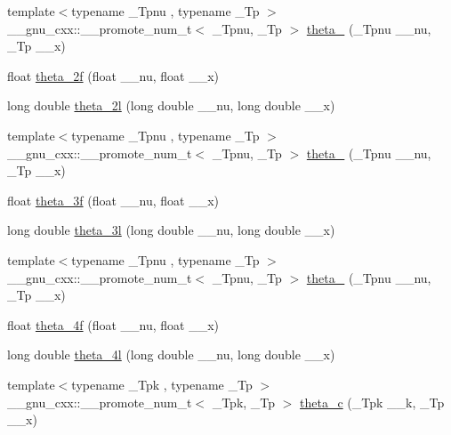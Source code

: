 \begin{DoxyCompactItemize}
\item 
{\footnotesize template$<$typename \+\_\+\+Tpnu , typename \+\_\+\+Tp $>$ }\\\+\_\+\+\_\+gnu\+\_\+cxx\+::\+\_\+\+\_\+promote\+\_\+num\+\_\+t$<$ \+\_\+\+Tpnu, \+\_\+\+Tp $>$ \hyperlink{namespace____gnu__cxx_a762aa79fc6c6320d7c6290359a42c2bc}{theta\+\_} (\+\_\+\+Tpnu \+\_\+\+\_\+nu, \+\_\+\+Tp \+\_\+\+\_\+x)
\item 
float \hyperlink{namespace____gnu__cxx_a78e832796aedf5159b142801e1184392}{theta\+\_\+2f} (float \+\_\+\+\_\+nu, float \+\_\+\+\_\+x)
\item 
long double \hyperlink{namespace____gnu__cxx_ac5a30c772d4888442665945e7f3fa017}{theta\+\_\+2l} (long double \+\_\+\+\_\+nu, long double \+\_\+\+\_\+x)
\item 
{\footnotesize template$<$typename \+\_\+\+Tpnu , typename \+\_\+\+Tp $>$ }\\\+\_\+\+\_\+gnu\+\_\+cxx\+::\+\_\+\+\_\+promote\+\_\+num\+\_\+t$<$ \+\_\+\+Tpnu, \+\_\+\+Tp $>$ \hyperlink{namespace____gnu__cxx_a1383b7486de1e177f19c45411ed957c3}{theta\+\_} (\+\_\+\+Tpnu \+\_\+\+\_\+nu, \+\_\+\+Tp \+\_\+\+\_\+x)
\item 
float \hyperlink{namespace____gnu__cxx_a9a7c967d2a456f1a6aceee9a53f024b1}{theta\+\_\+3f} (float \+\_\+\+\_\+nu, float \+\_\+\+\_\+x)
\item 
long double \hyperlink{namespace____gnu__cxx_af88874ff6c69940d2191f7947d2ea119}{theta\+\_\+3l} (long double \+\_\+\+\_\+nu, long double \+\_\+\+\_\+x)
\item 
{\footnotesize template$<$typename \+\_\+\+Tpnu , typename \+\_\+\+Tp $>$ }\\\+\_\+\+\_\+gnu\+\_\+cxx\+::\+\_\+\+\_\+promote\+\_\+num\+\_\+t$<$ \+\_\+\+Tpnu, \+\_\+\+Tp $>$ \hyperlink{namespace____gnu__cxx_a7b4afc32eb3f1d7c49662cd37af56a20}{theta\+\_} (\+\_\+\+Tpnu \+\_\+\+\_\+nu, \+\_\+\+Tp \+\_\+\+\_\+x)
\item 
float \hyperlink{namespace____gnu__cxx_a0c5cbf87e304844ed4c3423be5ca09a5}{theta\+\_\+4f} (float \+\_\+\+\_\+nu, float \+\_\+\+\_\+x)
\item 
long double \hyperlink{namespace____gnu__cxx_aaf63a80e90cdcdd66ebb18cd3a84afae}{theta\+\_\+4l} (long double \+\_\+\+\_\+nu, long double \+\_\+\+\_\+x)
\item 
{\footnotesize template$<$typename \+\_\+\+Tpk , typename \+\_\+\+Tp $>$ }\\\+\_\+\+\_\+gnu\+\_\+cxx\+::\+\_\+\+\_\+promote\+\_\+num\+\_\+t$<$ \+\_\+\+Tpk, \+\_\+\+Tp $>$ \hyperlink{namespace____gnu__cxx_ad2326374205feca04a9996af0a4ebd2a}{theta\+\_\+c} (\+\_\+\+Tpk \+\_\+\+\_\+k, \+\_\+\+Tp \+\_\+\+\_\+x)

\end{DoxyCompactItemize}
